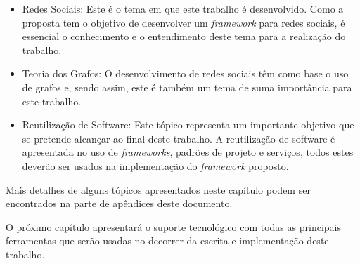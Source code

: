 \begin{itemize}
	\item Redes Sociais: Este é o tema em que este trabalho é desenvolvido. Como a proposta tem o objetivo de desenvolver um \textit{framework} para redes sociais, é essencial o conhecimento e o entendimento deste tema para a realização do trabalho.
	\item Teoria dos Grafos: O desenvolvimento de redes sociais têm como base o uso de grafos e, sendo assim, este é também um tema de suma importância para este trabalho.
	\item Reutilização de Software: Este tópico representa um importante objetivo que se pretende alcançar ao final deste trabalho. A reutilização de software é apresentada no uso de \textit{frameworks}, padrões de projeto e serviços, todos estes deverão ser usados na implementação do \textit{framework} proposto.
\end{itemize}

Mais detalhes de alguns tópicos apresentados neste capítulo podem ser encontrados na parte de apêndices deste documento.

O próximo capítulo apresentará o suporte tecnológico com todas as principais ferramentas que serão usadas no decorrer da escrita e implementação deste trabalho.
